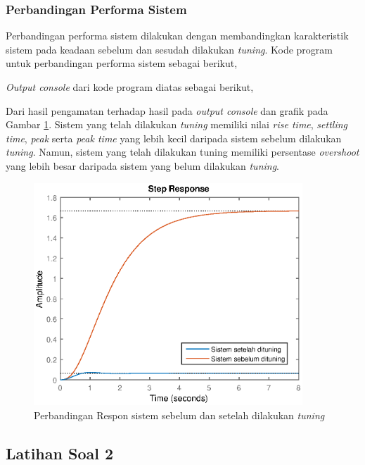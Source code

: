 \documentclass[../main.tex]{subfiles}
\begin{document}
            \subsubsection{Perbandingan Performa Sistem}
                Perbandingan performa sistem dilakukan dengan membandingkan karakteristik sistem pada keadaan sebelum dan sesudah dilakukan \textit{tuning}. Kode program untuk perbandingan performa sistem sebagai berikut,
                
                \textit{Output console} dari kode program diatas sebagai berikut, 
                
                Dari hasil pengamatan terhadap hasil pada \textit{output console} dan grafik pada Gambar \ref{plot_respon_sistem_2}. Sistem yang telah dilakukan \textit{tuning} memiliki nilai \textit{rise time}, \textit{settling time}, \textit{peak} serta \textit{peak time} yang lebih kecil daripada sistem sebelum dilakukan \textit{tuning}. Namun, sistem yang telah dilakukan tuning memiliki persentase \textit{overshoot} yang lebih besar daripada sistem yang belum dilakukan \textit{tuning}.
                \begin{figure}[H]
                    \centering
                    \includegraphics[width = 0.9\textwidth]{assets/image/UJI_SISTEM_1_2_rev.eps}
                    \caption{Perbandingan Respon sistem sebelum dan setelah dilakukan \textit{tuning}}
                    \label{plot_respon_sistem_2}
                \end{figure}
            \subsection{Latihan Soal 2}
\end{document}
